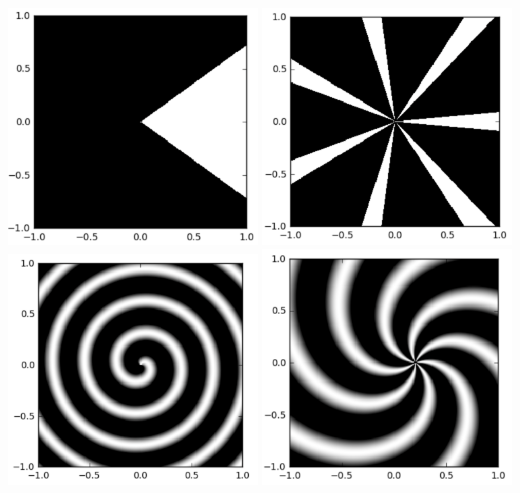 \documentclass[letterpaper,11pt]{amsart}
\theoremstyle{plain}
\theoremstyle{definition}
\begin{document}
\begin{center}
\noindent\includegraphics[width=2.6in]{im1.png}
\noindent\includegraphics[width=2.6in]{im2.png}
\noindent\includegraphics[width=2.6in]{im3.png}
\noindent\includegraphics[width=2.6in]{im4b.png}
\end{center}
\end{document}
